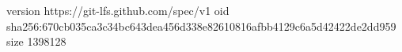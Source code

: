version https://git-lfs.github.com/spec/v1
oid sha256:670cb035ca3c34bc643dea456d338e82610816afbb4129c6a5d42422de2dd959
size 1398128
